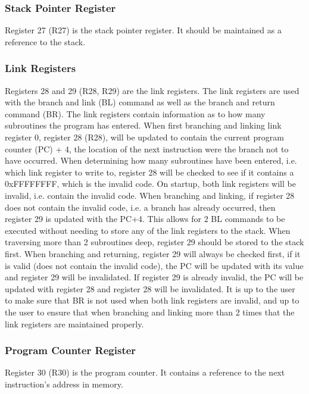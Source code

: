 \documentclass[12pt]{article}
\begin{document}
    \subsubsection{Stack Pointer Register}
        Register 27 (R27) is the stack pointer register. It should be maintained as a reference to the stack.
        
    \subsubsection{Link Registers}
        Registers 28 and 29 (R28, R29) are the link registers. The link registers are used with the branch and link (BL) command as well as the branch and return command (BR). The link registers contain information as to how many subroutines the program has entered. When first branching and linking link register 0, register 28 (R28), will be updated to contain the current program counter (PC) + 4, the location of the next instruction were the branch not to have occurred. When determining how many subroutines have been entered, i.e. which link register to write to, register 28 will be checked to see if it contains a 0xFFFFFFFF, which is the invalid code. On startup, both link registers will be invalid, i.e. contain the invalid code. When branching and linking, if register 28 does not contain the invalid code, i.e. a branch has already occurred, then register 29 is updated with the PC+4. This allows for 2 BL commands to be executed without needing to store any of the link registers to the stack. When traversing more than 2 subroutines deep, register 29 should be stored to the stack first. When branching and returning, register 29 will always be checked first, if it is valid (does not contain the invalid code), the PC will be updated with its value and register 29 will be invalidated. If register 29 is already invalid, the PC will be updated with register 28 and register 28 will be invalidated. It is up to the user to make sure that BR is not used when both link registers are invalid, and up to the user to ensure that when branching and linking more than 2 times that the link registers are maintained properly.
        
    \subsubsection{Program Counter Register}
        Register 30 (R30) is the program counter. It contains a reference to the next instruction's address in memory.
        
\end{document}
